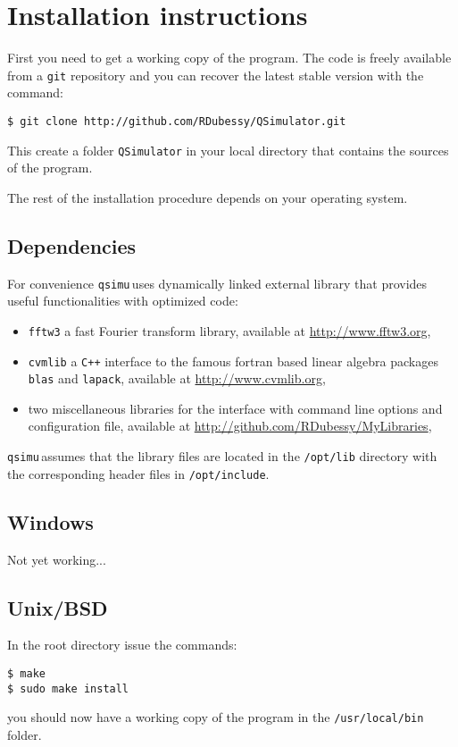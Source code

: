 \documentclass[12pt,a4paper]{report}
\newcommand{\qsimu}{\texttt{qsimu}\,}
\begin{document}
\section{Installation instructions}
First you need to get a working copy of the program.
The code is freely available from a \texttt{git} repository and you can recover the latest stable version with the command:
\begin{verbatim}
$ git clone http://github.com/RDubessy/QSimulator.git
\end{verbatim}
This create a folder \texttt{QSimulator} in your local directory that contains the sources of the program.

The rest of the installation procedure depends on your operating system.

\subsection{Dependencies}
For convenience \qsimu uses dynamically linked external library that provides useful functionalities with optimized code:
\begin{itemize}
\item \texttt{fftw3} a fast Fourier transform library, available at \url{http://www.fftw3.org},
\item \texttt{cvmlib} a \texttt{C++} interface to the famous fortran based linear algebra packages \texttt{blas} and \texttt{lapack}, available at \url{http://www.cvmlib.org},
\item two miscellaneous libraries for the interface with command line options and configuration file, available at \url{http://github.com/RDubessy/MyLibraries},
\end{itemize}
\qsimu assumes that the library files are located in the \texttt{/opt/lib} directory with the corresponding header files in \texttt{/opt/include}.

\subsection{Windows}
Not yet working...

\subsection{Unix/BSD}
In the root directory issue the commands:
\begin{verbatim}
$ make
$ sudo make install
\end{verbatim}
you should now have a working copy of the program in the \texttt{/usr/local/bin} folder.
\end{document}
